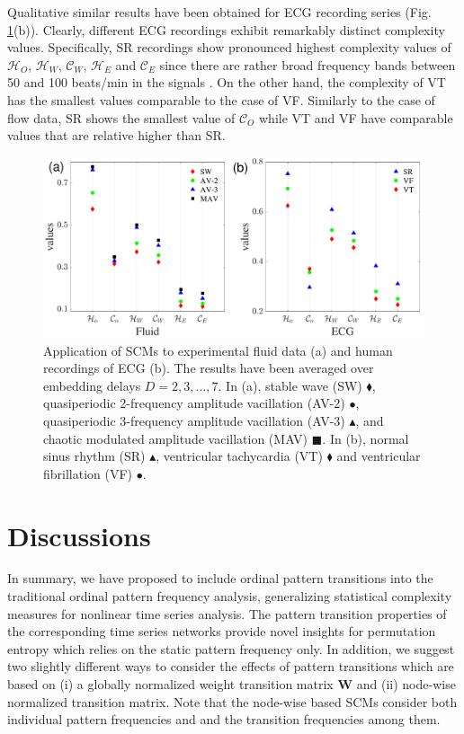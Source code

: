 \documentclass[12pt,aip,cha,reprint,nofootinbib]{revtex4-1}
\begin{document}
Qualitative similar results have been obtained for ECG recording series (Fig. \ref{fig:fluid}(b)). Clearly, different ECG recordings exhibit remarkably distinct complexity values. Specifically, SR recordings show pronounced highest complexity values of $\mathcal{H}_O$, $\mathcal{H}_W$, $\mathcal{C}_W$, $\mathcal{H}_E$ and $\mathcal{C}_E$ since there are rather broad frequency bands between 50 and 100 beats/min in the signals \cite{smallCSF2002}. On the other hand, the complexity of VT has the smallest values comparable to the case of VF. Similarly to the case of flow data, SR shows the smallest value of $\mathcal{C}_O$ while VT and VF have comparable values that are relative higher than SR. 
\begin{figure}
	\centering 
	\includegraphics[width=2\columnwidth]{fluidExample.pdf}
\caption{\small{Application of SCMs to experimental fluid data (a) and human recordings of ECG (b). The results have been averaged over embedding delays $D = 2, 3, \dots, 7$. In (a), stable wave (SW) $\blacklozenge$, quasiperiodic 2-frequency amplitude vacillation (AV-2) $\bullet$, quasiperiodic 3-frequency amplitude vacillation (AV-3) $\blacktriangle$, and chaotic modulated amplitude vacillation (MAV) $\blacksquare$. In (b), normal sinus rhythm (SR) $\blacktriangle$, ventricular tachycardia (VT) $\blacklozenge$ and ventricular fibrillation (VF) $\bullet$. } \label{fig:fluid}}
\end{figure}


\section{Discussions} \label{sec:con}
In summary, we have proposed to include ordinal pattern transitions into the traditional ordinal pattern frequency analysis, generalizing statistical complexity measures for nonlinear time series analysis. The pattern transition properties of the corresponding time series networks provide novel insights for permutation entropy which relies on the static pattern frequency only. In addition, we suggest two slightly different ways to consider the effects of pattern transitions which are based on (i) a globally normalized weight transition matrix $\mathbf{W}$ and (ii) node-wise normalized transition matrix. Note that the node-wise based SCMs consider both individual pattern frequencies and and the transition frequencies among them. 
\end{document}
